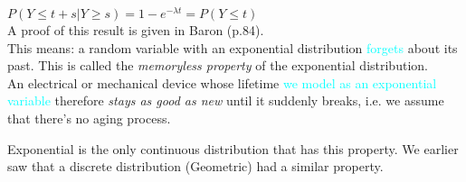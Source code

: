 \documentclass[20pt,landscape]{foils}
\newcommand{\no}{\noindent}
\begin{document}
{\foilhead[-.75in]{\textcolor{blue}{Memoryless property of the Exponential distribution}}\vspace{.1in} 
\no \hspace*{1in} $P(Y \le t + s | Y \ge s) = 1 - e^{-\lambda t} = P(Y \le t)$\\[.15in]
\no A proof of this result is given in Baron (p.84).\\[.2in] 
\no This means: a random variable with an exponential distribution 
 {\textcolor{cyan}{forgets}} about its past. This is called the {\it memoryless 
property} of the exponential distribution.\\[.1in]
\no An electrical or mechanical device whose lifetime  {\textcolor{cyan}{we model as an 
exponential variable}} therefore \emph{stays as good as new} until it 
suddenly breaks, i.e. we assume that there's no aging process.

\no Exponential is the only continuous distribution that has this property. We earlier saw that a discrete distribution (Geometric) had a similar property.


}
\end{document}
